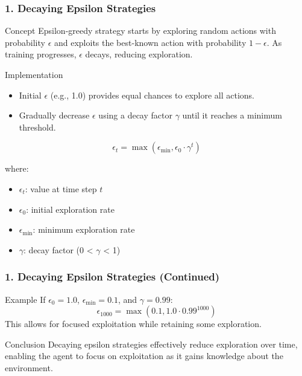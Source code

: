 \documentclass[aspectratio=169]{beamer}
\begin{document}
\begin{frame}[fragile]
    \frametitle{1. Decaying Epsilon Strategies}
    \begin{block}{Concept}
        Epsilon-greedy strategy starts by exploring random actions with probability \( \epsilon \) and exploits the best-known action with probability \( 1 - \epsilon \). As training progresses, \( \epsilon \) decays, reducing exploration.
    \end{block}

    \begin{block}{Implementation}
        \begin{itemize}
            \item Initial \( \epsilon \) (e.g., 1.0) provides equal chances to explore all actions.
            \item Gradually decrease \( \epsilon \) using a decay factor \( \gamma \) until it reaches a minimum threshold.
        \end{itemize}
    \end{block}

    \begin{equation}
        \epsilon_t = \max(\epsilon_{\text{min}}, \epsilon_0 \cdot \gamma^t)
    \end{equation}
    
    where:
    \begin{itemize}
        \item \( \epsilon_t \): value at time step \( t \)
        \item \( \epsilon_0 \): initial exploration rate
        \item \( \epsilon_{\text{min}} \): minimum exploration rate
        \item \( \gamma \): decay factor (0 < \( \gamma \) < 1)
    \end{itemize}
\end{frame}

\begin{frame}[fragile]
    \frametitle{1. Decaying Epsilon Strategies (Continued)}
    \begin{block}{Example}
        If \( \epsilon_0 = 1.0 \), \( \epsilon_{\text{min}} = 0.1 \), and \( \gamma = 0.99 \):
        \begin{equation}
            \epsilon_{1000} = \max(0.1, 1.0 \cdot 0.99^{1000})
        \end{equation}
        This allows for focused exploitation while retaining some exploration.
    \end{block}

    \begin{block}{Conclusion}
        Decaying epsilon strategies effectively reduce exploration over time, enabling the agent to focus on exploitation as it gains knowledge about the environment.
    \end{block}
\end{frame}
\end{document}
